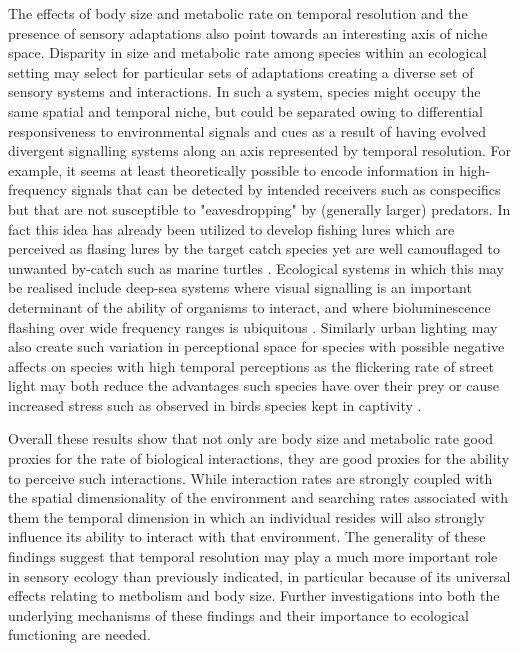 The effects of body size and metabolic rate on temporal resolution and the presence of sensory adaptations also point towards an interesting axis of niche space. Disparity in size and metabolic rate among species within an ecological setting may select for particular sets of adaptations creating a diverse set of sensory systems and interactions. In such a system, species might occupy the same spatial and temporal niche,
 but could be separated owing to differential responsiveness to environmental signals and cues as a result of having evolved divergent signalling systems along an axis represented by temporal resolution. For example, it seems at least theoretically possible to encode information in high-frequency signals that can be detected by intended receivers such as conspecifics but that are not susceptible to "eavesdropping" by (generally larger) predators. In fact this idea has already been utilized to develop fishing lures which are perceived as flasing lures by the target catch species yet are well camouflaged to unwanted by-catch such as marine turtles \citep{jordan2013linking,crognale2008leatherback}. Ecological systems in which this may be realised include deep-sea systems where visual signalling is an important determinant of the ability of organisms to interact, and where bioluminescence flashing over wide frequency ranges is ubiquitous \citep{haddock2005bioluminescent,widder2010bioluminescence}. Similarly urban lighting may also create such variation in perceptional space for species with possible negative affects on species with high temporal perceptions as the flickering rate of street light may both reduce the advantages such species have over their prey or cause increased stress such as observed in birds species kept in captivity \citep{inger2014potential}. 


Overall these results show that not only are body size and metabolic rate good proxies for the rate of biological interactions, they are good proxies for the ability to perceive such interactions. While interaction rates are strongly coupled with the spatial dimensionality of the environment and searching rates associated with them \citep{pawar2012dimensionality} the temporal dimension in which an individual resides will also strongly influence its ability to interact with that environment. The generality of these findings suggest that temporal resolution may play a much more important role in sensory ecology than previously indicated, in particular because of its universal effects relating to metbolism and body size. Further investigations into both the underlying mechanisms of these findings and their importance to ecological functioning are needed.


%
%


